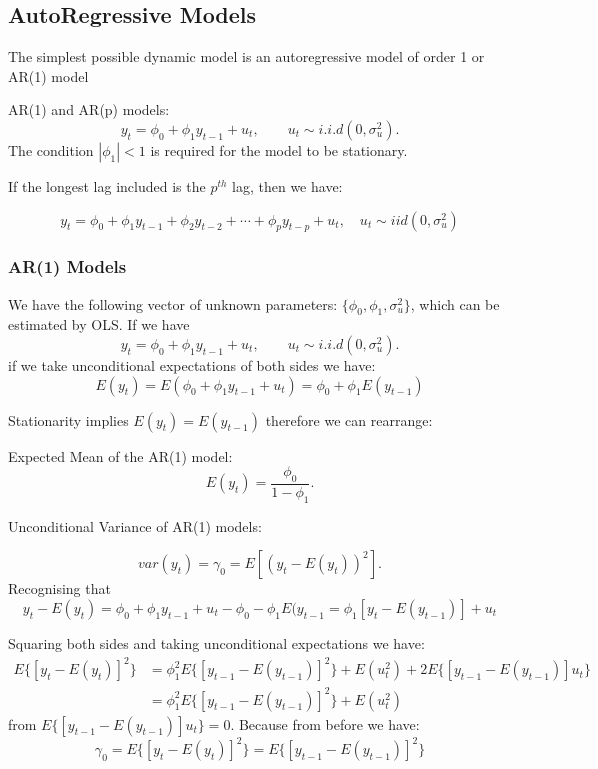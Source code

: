 \documentclass[11pt]{article}
\begin{document}
\subsection{AutoRegressive Models}
The simplest possible dynamic model is an autoregressive model of order 1 or AR(1) model

\begin{definition}
    AR(1) and AR(p) models:
    \begin{equation}
        \label{AR1 model}
        y_t = \phi_0 + \phi_1 y_{t-1} + u_t, \qquad u_t \sim i.i.d(0,\sigma_u^2).
    \end{equation}
    The condition $|\phi_1|<1$ is required for the model to be stationary.

If the longest lag included is the $p^{th}$ lag, then we have:

\begin{equation}
\label{ARp model}
y_t=\phi_0+\phi_1 y_{t-1}+\phi_2 y_{t-2}+\cdots+\phi_p y_{t-p}+u_t, \quad u_t \sim i i d\left(0, \sigma_u^2\right)
\end{equation}
\end{definition}

\subsubsection{AR(1) Models}

We have the following vector of unknown parameters: $\{\phi_0, \phi_1, \sigma_u^2\}$, which can be estimated by OLS. If we have 
\[y_t = \phi_0 + \phi_1 y_{t-1} + u_t, \qquad u_t \sim i.i.d(0,\sigma_u^2).
    \]
    if we take unconditional expectations of both sides we have:
    \[E(y_t) = E(\phi_0 + \phi_1 y_{t-1} + u_t) = \phi_0 + \phi_1 E(y_{t-1})\]

    Stationarity implies $E(y_t) = E(y_{t-1})$ therefore we can rearrange:
    

    \begin{definition}
    Expected Mean of the AR(1) model:
        \[E(y_t) = \dfrac{\phi_0}{1-\phi_1}.\]
    \end{definition}


Unconditional Variance of AR(1) models:

\[var(y_t) = \gamma_0 = E[(y_t - E(y_t))^2].\]
Recognising that  
\[y_t - E(y_t) = \phi_0 + \phi_1 y_{t-1} + u_t - \phi_0 - \phi_1 E(y_{t-1} = \phi_1 [y_t - E(y_{t-1})] + u_t\]

Squaring both sides and taking unconditional expectations we have:
\begin{align*}
    E\{[y_t-E(y_t)]^2\} &= \phi_1^2 E\{[y_{t-1} - E(y_{t-1})]^2\} + E(u_t^2) + 2 E\{[y_{t-1}-E(y_{t-1})]u_t\} \\
    & = \phi_1^2 E\{[y_{t-1} - E(y_{t-1})]^2\}+ E(u_t^2)
\end{align*}
from $E\{[y_{t-1}-E(y_{t-1})]u_t\} = 0$. Because from before we have:
\[\gamma_0 = E\{[y_t - E(y_t)]^2\} = E\{[y_{t-1} - E(y_{t-1})]^2\}\]
\end{document}

